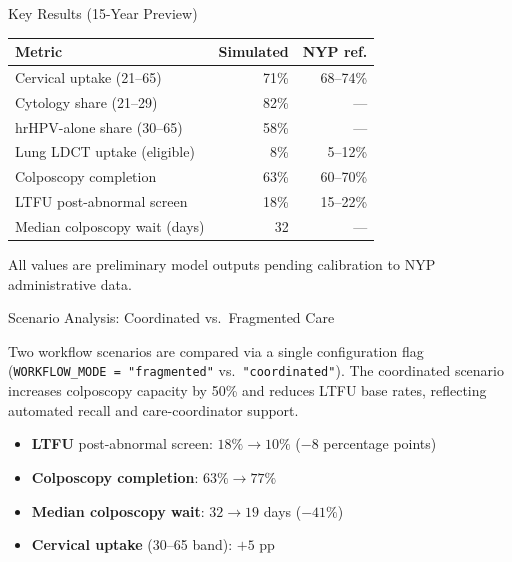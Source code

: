 \documentclass[final]{beamer}
\newlength{\colwidth}
\begin{document}
\begin{frame}[t]
\begin{columns}[t]
\begin{column}{\colwidth}
  \begin{exampleblock}{Key Results (15-Year Preview)}

    \begin{center}
    \begin{tabular}{l r r}
      \toprule
      \textbf{Metric} & \textbf{Simulated} & \textbf{NYP ref.} \\
      \midrule
      Cervical uptake (21--65)         & 71\%  & 68--74\% \\
      Cytology share (21--29)          & 82\%  & ---      \\
      hrHPV-alone share (30--65)       & 58\%  & ---      \\
      Lung LDCT uptake (eligible)      & 8\%   & 5--12\%  \\
      Colposcopy completion            & 63\%  & 60--70\% \\
      LTFU post-abnormal screen        & 18\%  & 15--22\% \\
      Median colposcopy wait (days)    & 32    & ---      \\
      \bottomrule
    \end{tabular}
    \end{center}

    All values are preliminary model outputs pending calibration to
    NYP administrative data.

  \end{exampleblock}

  \begin{block}{Scenario Analysis: Coordinated vs.\ Fragmented Care}

    Two workflow scenarios are compared via a single configuration flag
    (\texttt{WORKFLOW\_MODE = "fragmented"} vs.\ \texttt{"coordinated"}).
    The coordinated scenario increases colposcopy capacity by 50\% and
    reduces LTFU base rates, reflecting automated recall and care-coordinator
    support.


    \begin{itemize}
      \item \textbf{LTFU} post-abnormal screen: $18\% \to 10\%$
            \quad ($-8$ percentage points)
      \item \textbf{Colposcopy completion}: $63\% \to 77\%$
      \item \textbf{Median colposcopy wait}: $32 \to 19$ days ($-41\%$)
      \item \textbf{Cervical uptake} (30--65 band): $+5$ pp
    \end{itemize}


\end{block}
\end{column}
\end{columns}
\end{frame}
\end{document}
